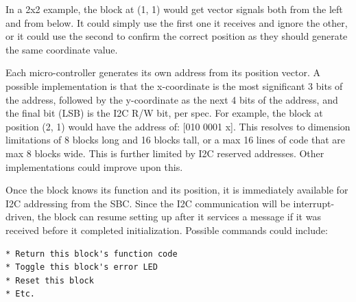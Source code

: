 In a 2x2 example, the block at (1, 1) would get vector signals both from the left and from below. It could simply use the first one it receives and ignore the other, or it could use the second to confirm the correct position as they should generate the same coordinate value.


Each micro-controller generates its own address from its position vector. A possible implementation is that the x-coordinate is the most significant 3 bits of the address, followed by the y-coordinate as the next 4 bits of the address, and the final bit (LSB) is the I2C R/W bit, per spec. For example, the block at position (2, 1) would have the address of: [010 0001 x]. This resolves to dimension limitations of 8 blocks long and 16 blocks tall, or a max 16 lines of code that are max 8 blocks wide. This is further limited by I2C reserved addresses. Other implementations could improve upon this.


Once the block knows its function and its position, it is immediately available for I2C addressing from the SBC. Since the I2C communication will be interrupt-driven, the block can resume setting up after it services a message if it was received before it completed initialization. Possible commands could include:
\begin{verbatim}
* Return this block's function code
* Toggle this block's error LED
* Reset this block
* Etc.
\end{verbatim}
   
